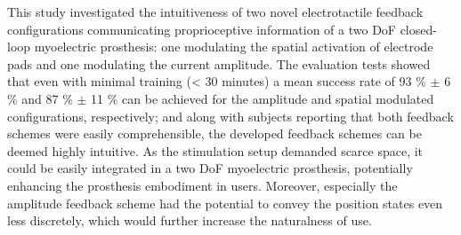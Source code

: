This study investigated the intuitiveness of two novel electrotactile feedback configurations communicating proprioceptive information of a two DoF closed-loop myoelectric prosthesis: one modulating the spatial activation of electrode pads and one modulating the current amplitude. The evaluation tests showed that even with minimal training (< 30 minutes) a mean success rate of 93 \% $\pm$ 6 \% and 87 \% $\pm$ 11 \% can be achieved for the amplitude and spatial modulated configurations, respectively; and along with subjects reporting that both feedback schemes were easily comprehensible, the developed feedback schemes can be deemed highly intuitive. As the stimulation setup demanded scarce space, it could be easily integrated in a two DoF myoelectric prosthesis, potentially enhancing the prosthesis embodiment in users. Moreover, especially the amplitude feedback scheme had the potential to convey the position states even less discretely, which would further increase the naturalness of use. 